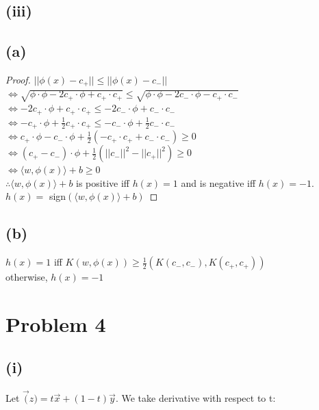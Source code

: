 \documentclass[twoside,11pt]{homework}
\begin{document}
 \subsection*{(iii)}
 	\subsection*{(a)}
 	\begin{proof}
 		$ || \phi(x) - c_+ || \leq || \phi(x) - c_-||$ \\
 		$ \iff  \sqrt{\phi \cdot \phi - 2c_+ \cdot \phi + c_+ \cdot c_+} \leq  \sqrt{\phi \cdot \phi - 2c_- \cdot \phi - c_+ \cdot c_-}$\\
 		$ \iff  - 2c_+ \cdot \phi + c_+ \cdot c_+ \leq  - 2c_- \cdot \phi + c_- \cdot c_-$ \\
 		$\iff - c_+ \cdot \phi + \frac{1}{2} c_+ \cdot c_+ \leq  - c_- \cdot \phi + \frac{1}{2} c_- \cdot c_- $ \\
 		$\iff  c_+ \cdot \phi - c_- \cdot \phi + \frac{1}{2} (-c_+ \cdot c_+  + c_- \cdot c_-) \geq 0$ \\
 		$\iff  (c_+ - c_-) \cdot \phi + \frac{1}{2} ( ||c_-||^2 - ||c_+ ||^2) \geq 0$ \\
 		$\iff  \langle w, \phi(x) \rangle + b \geq 0$ \\
 		$\therefore \langle w, \phi(x) \rangle + b$  is positive iff $h(x)  = 1$ and is negative iff $h(x) = -1$.\\
 		$h(x)  =$ sign$( \langle w, \phi(x) \rangle + b)$
 	\end{proof}

 	\subsection*{(b)}
 	$h(x) = 1$ iff $K(w, \phi(x)) \geq \frac{1}{2}(K(c_-, c_-), K(c_+, c_+))$\\
 	otherwise, $h(x) = -1$




\section{Problem 4}
\subsection{(i)}

Let $\vec(z) = t\vec{x} +(1-t)\vec{y}$. We take derivative with respect to t:
\end{document}
